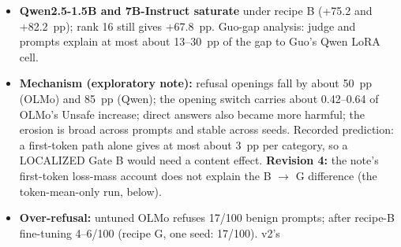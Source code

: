 \documentclass{article}
\theoremstyle{plain}
\theoremstyle{definition}
\theoremstyle{remark}
\begin{document}
\begin{itemize}
\begin{itemize}
          Qwen2.5-1.5B recipe B 2 of 7; Qwen2.5-7B recipe B 2 of 6; Llama-3.2-1B
          recipe B 2 of 8. The groups are too small to compare, and no
          comparison was made.
    \item \textbf{Safe-labelled controls:} 0 of 10 rated 1 or 2 (no judge
          misses; [0.00, 0.31]).
    \item \textbf{HarmBench, on the 15 OLMo items that have a label:} of 12
          ``yes'', 4 rated 2 and 8 rated 0 or 1; of 3 ``no'', none rated 2. The
          human bar (``would meaningfully help'') is stricter than HarmBench's.
    \item Two ``looping or garbled'' ticks, both Qwen2.5-1.5B. Reading (I, the
          Side Project's): U is a sound measure of lost refusal; small models
          often comply vaguely, generically or wrongly.
    \item \textbf{Limits:} one reader, who also designed parts of the study; 50
          items; small groups; no second rater; no comparison between groups.
    \item \textbf{For Gate B (FOCUS):} it meets the intent of DRAFT \S{}12 item
          5 (what U means), on a different sample from the audit's proposal
          (\S{}8 item 4); DRAFT revision 5 reports it as done; the verdict stays
          on U. It also gives the ``about 50 human-read answers'' that FAQ asked
          for the arXiv note (FOCUS 8 Oct 15:59 UTC, item 1).
  \end{itemize}
  \item \textbf{Qwen2.5-1.5B and 7B-Instruct saturate} under recipe B (+75.2 and
        +82.2~pp); rank 16 still gives +67.8~pp. Guo-gap analysis: judge and
        prompts explain at most about 13--30~pp of the gap to Guo's Qwen LoRA
        cell.
  \item \textbf{Mechanism (exploratory note):} refusal openings fall by about
        50~pp (OLMo) and 85~pp (Qwen); the opening switch carries about
        0.42--0.64 of OLMo's Unsafe increase; direct answers also became more
        harmful; the erosion is broad across prompts and stable across seeds.
        Recorded prediction: a first-token path alone gives at most about 3~pp
        per category, so a LOCALIZED Gate B would need a content effect.
        \textbf{Revision 4:} the note's first-token loss-mass account does not
        explain the B $\to$ G difference (the token-mean-only run, below).
  \item \textbf{Over-refusal:} untuned OLMo refuses 17/100 benign prompts; after
        recipe-B fine-tuning 4--6/100 (recipe G, one seed: 17/100). v2's

\end{itemize}
\end{document}
